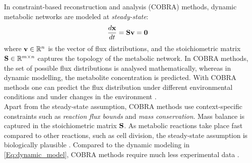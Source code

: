 In constraint-based reconstruction and analysis (COBRA) methods, dynamic metabolic networks are modeled at \textit{steady-state}: 
\begin{equation*}
    \frac{d \bold x}{dt} = \bold S \bold v= \bold 0 
\end{equation*} 
\quad where $\bold v \in \mathbb{R}^n$ is the vector of flux distributions, and the stoichiometric matrix $\bold S \in \mathbb{R}^{m \times n}$ captures the topology of the metabolic network. In COBRA methods, the set of possible flux distributions is analysed mathematically, whereas in dynamic modelling, the metabolite concentration is predicted. With COBRA methods one can predict the flux distribution under different environmental conditions and under changes in the environment \cite{intro_computational_systems_biology}.
\\
Apart from the steady-state assumption, COBRA methods use context-specific constraints such as \textit{reaction flux bounds} and \textit{mass conservation}. %
Mass balance is captured in the stoichiometric matrix $\bold S$. 
As metabolic reactions take place fast compared to other reactions, such as cell division, the steady-state assumption is biologically plausible \cite{enumerate_extreme_rays}. Compared to the dynamic modeling in \cref{Eq:dynamic_model}, COBRA methods require much less experimental data \cite{intro_computational_systems_biology}. 

